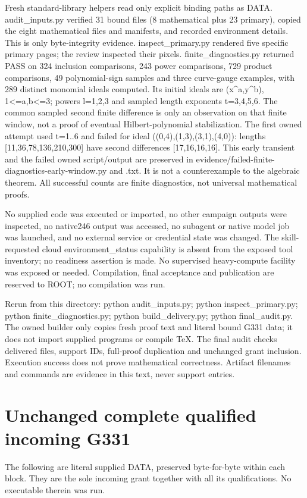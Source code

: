 \documentclass[11pt]{article}
\begin{document}
Fresh standard-library helpers read only explicit binding paths as DATA. audit\_inputs.py verified 31 bound files (8 mathematical plus 23 primary), copied the eight mathematical files and manifests, and recorded environment details. This is only byte-integrity evidence. inspect\_primary.py rendered five specific primary pages; the review inspected their pixels. finite\_diagnostics.py returned PASS on 324 inclusion comparisons, 243 power comparisons, 729 product comparisons, 49 polynomial-sign samples and three curve-gauge examples, with 289 distinct monomial ideals computed. Its initial ideals are (x\textasciicircum{}a,y\textasciicircum{}b), 1<=a,b<=3; powers l=1,2,3 and sampled length exponents t=3,4,5,6. The common sampled second finite difference is only an observation on that finite window, not a proof of eventual Hilbert-polynomial stabilization. The first owned attempt used t=1..6 and failed for ideal ((0,4),(1,3),(3,1),(4,0)): lengths [11,36,78,136,210,300] have second differences [17,16,16,16]. This early transient and the failed owned script/output are preserved in evidence/failed-finite-diagnostics-early-window.py and .txt. It is not a counterexample to the algebraic theorem. All successful counts are finite diagnostics, not universal mathematical proofs.

No supplied code was executed or imported, no other campaign outputs were inspected, no native246 output was accessed, no subagent or native model job was launched, and no external service or credential state was changed. The skill-requested cloud environment\_status capability is absent from the exposed tool inventory; no readiness assertion is made. No supervised heavy-compute facility was exposed or needed. Compilation, final acceptance and publication are reserved to ROOT; no compilation was run.

Rerun from this directory: python audit\_inputs.py; python inspect\_primary.py; python finite\_diagnostics.py; python build\_delivery.py; python final\_audit.py. The owned builder only copies fresh proof text and literal bound G331 data; it does not import supplied programs or compile TeX. The final audit checks delivered files, support IDs, full-proof duplication and unchanged grant inclusion. Execution success does not prove mathematical correctness. Artifact filenames and commands are evidence in this text, never support entries.

\appendix
\section{Unchanged complete qualified incoming G331}
The following are literal supplied DATA, preserved byte-for-byte within each block. They are the sole incoming grant together with all its qualifications. No executable therein was run.
\end{document}
